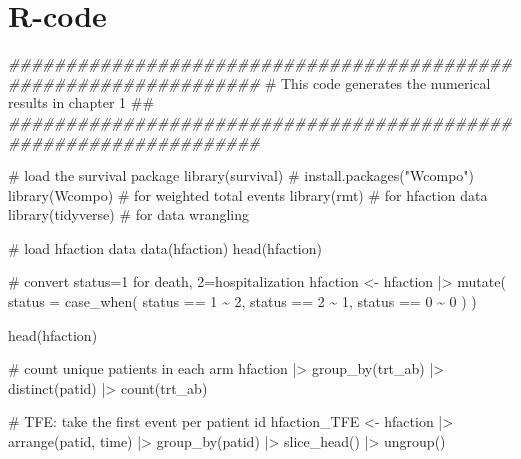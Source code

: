 \documentclass[
  letterpaper,
  DIV=11,
  numbers=noendperiod]{scrreprt}
\newenvironment{Shaded}{\begin{snugshade}}{\end{snugshade}}
\newcommand{\AttributeTok}[1]{\textcolor[rgb]{0.40,0.45,0.13}{#1}}
\newcommand{\CommentTok}[1]{\textcolor[rgb]{0.37,0.37,0.37}{#1}}
\newcommand{\DecValTok}[1]{\textcolor[rgb]{0.68,0.00,0.00}{#1}}
\newcommand{\DocumentationTok}[1]{\textcolor[rgb]{0.37,0.37,0.37}{\textit{#1}}}
\newcommand{\FunctionTok}[1]{\textcolor[rgb]{0.28,0.35,0.67}{#1}}
\newcommand{\NormalTok}[1]{\textcolor[rgb]{0.00,0.23,0.31}{#1}}
\newcommand{\OtherTok}[1]{\textcolor[rgb]{0.00,0.23,0.31}{#1}}
\newcommand{\SpecialCharTok}[1]{\textcolor[rgb]{0.37,0.37,0.37}{#1}}
\begin{document}
\hypertarget{r-code}{%
\section*{R-code}\label{r-code}}


\begin{Shaded}
\begin{Highlighting}[]
\DocumentationTok{\#\#\#\#\#\#\#\#\#\#\#\#\#\#\#\#\#\#\#\#\#\#\#\#\#\#\#\#\#\#\#\#\#\#\#\#\#\#\#\#\#\#\#\#\#\#\#\#\#\#\#\#\#\#\#\#\#\#\#\#\#\#\#\#\#\#}
\CommentTok{\# This code generates the numerical results in  chapter 1       \#\#}
\DocumentationTok{\#\#\#\#\#\#\#\#\#\#\#\#\#\#\#\#\#\#\#\#\#\#\#\#\#\#\#\#\#\#\#\#\#\#\#\#\#\#\#\#\#\#\#\#\#\#\#\#\#\#\#\#\#\#\#\#\#\#\#\#\#\#\#\#\#\#}

\CommentTok{\# load the survival package}
\FunctionTok{library}\NormalTok{(survival)}
\CommentTok{\# install.packages("Wcompo")}
\FunctionTok{library}\NormalTok{(Wcompo) }\CommentTok{\# for weighted total events}
\FunctionTok{library}\NormalTok{(rmt) }\CommentTok{\# for hfaction data}
\FunctionTok{library}\NormalTok{(tidyverse) }\CommentTok{\# for data wrangling}

\CommentTok{\# load hfaction data}
\FunctionTok{data}\NormalTok{(hfaction)}
\FunctionTok{head}\NormalTok{(hfaction)}

\CommentTok{\# convert status=1 for death, 2=hospitalization}
\NormalTok{hfaction }\OtherTok{\textless{}{-}}\NormalTok{ hfaction }\SpecialCharTok{|\textgreater{}} 
  \FunctionTok{mutate}\NormalTok{(}
    \AttributeTok{status =} \FunctionTok{case\_when}\NormalTok{(}
\NormalTok{      status }\SpecialCharTok{==} \DecValTok{1} \SpecialCharTok{\textasciitilde{}} \DecValTok{2}\NormalTok{,}
\NormalTok{      status }\SpecialCharTok{==} \DecValTok{2} \SpecialCharTok{\textasciitilde{}} \DecValTok{1}\NormalTok{,}
\NormalTok{      status }\SpecialCharTok{==} \DecValTok{0} \SpecialCharTok{\textasciitilde{}} \DecValTok{0}
\NormalTok{    )}
\NormalTok{  )}

\FunctionTok{head}\NormalTok{(hfaction)}

\CommentTok{\# count unique patients in each arm}
\NormalTok{hfaction }\SpecialCharTok{|\textgreater{}} 
  \FunctionTok{group\_by}\NormalTok{(trt\_ab) }\SpecialCharTok{|\textgreater{}} 
  \FunctionTok{distinct}\NormalTok{(patid) }\SpecialCharTok{|\textgreater{}} 
  \FunctionTok{count}\NormalTok{(trt\_ab)}

\CommentTok{\# TFE: take the first event per patient id}
\NormalTok{hfaction\_TFE }\OtherTok{\textless{}{-}}\NormalTok{ hfaction }\SpecialCharTok{|\textgreater{}} 
  \FunctionTok{arrange}\NormalTok{(patid, time) }\SpecialCharTok{|\textgreater{}} 
  \FunctionTok{group\_by}\NormalTok{(patid) }\SpecialCharTok{|\textgreater{}} 
  \FunctionTok{slice\_head}\NormalTok{() }\SpecialCharTok{|\textgreater{}} 
  \FunctionTok{ungroup}\NormalTok{()}


\end{Highlighting}
\end{Shaded}
\end{document}
